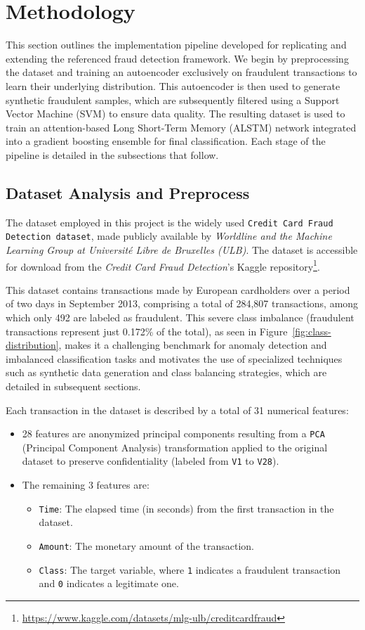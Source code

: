 \section{Methodology}
This section outlines the implementation pipeline developed for replicating and extending the referenced fraud detection framework. We begin by preprocessing the dataset and training an autoencoder exclusively on fraudulent transactions to learn their underlying distribution. This autoencoder is then used to generate synthetic fraudulent samples, which are subsequently filtered using a Support Vector Machine (SVM) to ensure data quality. The resulting dataset is used to train an attention-based Long Short-Term Memory (ALSTM) network integrated into a gradient boosting ensemble for final classification. Each stage of the pipeline is detailed in the subsections that follow.

\subsection{Dataset Analysis and Preprocess}
The dataset employed in this project is the widely used \texttt{Credit Card Fraud Detection dataset}, made publicly available by \textit{Worldline and the Machine Learning Group at Université Libre de Bruxelles (ULB)}. The dataset is accessible for download from the \textit{Credit Card Fraud Detection}'s Kaggle repository\footnote{\url{https://www.kaggle.com/datasets/mlg-ulb/creditcardfraud}}.

This dataset contains transactions made by European cardholders over a period of two days in September 2013, comprising a total of 284,807 transactions, among which only 492 are labeled as fraudulent. This severe class imbalance (fraudulent transactions represent just 0.172\% of the total), as seen in Figure~\ref{fig:class-distribution}, makes it a challenging benchmark for anomaly detection and imbalanced classification tasks and motivates the use of specialized techniques such as synthetic data generation and class balancing strategies, which are detailed in subsequent sections.

Each transaction in the dataset is described by a total of 31 numerical features:
\begin{itemize}
    \item 28 features are anonymized principal components resulting from a \texttt{PCA} (Principal Component Analysis) transformation applied to the original dataset to preserve confidentiality (labeled from \texttt{V1} to \texttt{V28}).
    \item The remaining 3 features are:
        \begin{itemize}
            \item \texttt{Time}: The elapsed time (in seconds) from the first transaction in the dataset.
            \item \texttt{Amount}: The monetary amount of the transaction.
            \item \texttt{Class}: The target variable, where \texttt{1} indicates a fraudulent transaction and \texttt{0} indicates a legitimate one.
        \end{itemize}
\end{itemize}

